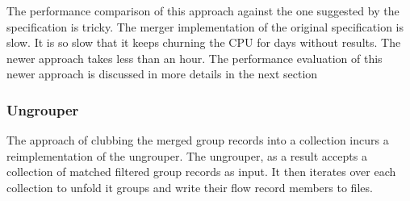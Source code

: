 The performance comparison of this approach against the one suggested by the
specification is tricky. The merger implementation of the original
specification is slow. It is so slow that it keeps churning the CPU for days
without results. The newer approach takes less than an hour. The performance
evaluation of this newer approach is discussed in more details in the next
section

\subsubsection{Ungrouper} The approach of clubbing the merged group records into
a collection incurs a reimplementation of the ungrouper. The ungrouper, as a
result accepts a collection of matched filtered group records as input. It
then iterates over each collection to unfold it groups and write their flow
record members to files.

